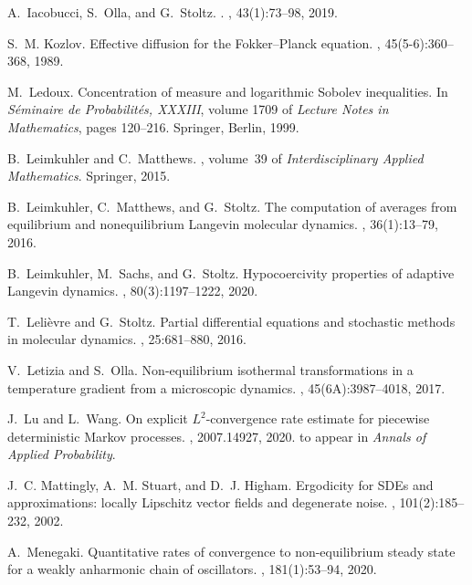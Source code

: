 \documentclass{article}
\begin{document}
\begin{thebibliography}{10}
A.~{Iacobucci}, S.~{Olla}, and G.~{Stoltz}.
.
, 43(1):73--98, 2019.

S.~M. Kozlov.
\newblock Effective diffusion for the {F}okker--{P}lanck equation.
, 45(5-6):360–368, 1989.

M.~Ledoux.
\newblock Concentration of measure and logarithmic {S}obolev inequalities.
\newblock In {\em S\'{e}minaire de {P}robabilit\'{e}s, {XXXIII}}, volume 1709
  of {\em Lecture Notes in Mathematics}, pages 120--216. Springer, Berlin,
  1999.

B.~Leimkuhler and C.~Matthews.
, volume~39 of {\em Interdisciplinary Applied
  Mathematics}.
\newblock Springer, 2015.

B.~Leimkuhler, C.~Matthews, and G.~Stoltz.
\newblock The computation of averages from equilibrium and nonequilibrium
  {L}angevin molecular dynamics.
, 36(1):13--79, 2016.

B.~Leimkuhler, M.~Sachs, and G.~Stoltz.
\newblock Hypocoercivity properties of adaptive {L}angevin dynamics.
, 80(3):1197--1222, 2020.

T.~Leli\`evre and G.~Stoltz.
\newblock Partial differential equations and stochastic methods in molecular
  dynamics.
, 25:681--880, 2016.

V.~Letizia and S.~Olla.
\newblock Non-equilibrium isothermal transformations in a temperature gradient
  from a microscopic dynamics.
, 45(6A):3987--4018, 2017.

J.~Lu and L.~Wang.
\newblock On explicit {$L^2$}-convergence rate estimate for piecewise
  deterministic {M}arkov processes.
, 2007.14927, 2020.
\newblock to appear in \emph{Annals of Applied Probability}.

J.~C. Mattingly, A.~M. Stuart, and D.~J. Higham.
\newblock Ergodicity for {SDE}s and approximations: locally {L}ipschitz vector
  fields and degenerate noise.
, 101(2):185--232, 2002.

A.~Menegaki.
\newblock Quantitative rates of convergence to non-equilibrium steady state for
  a weakly anharmonic chain of oscillators.
, 181(1):53–94, 2020.


\end{thebibliography}
\end{document}
